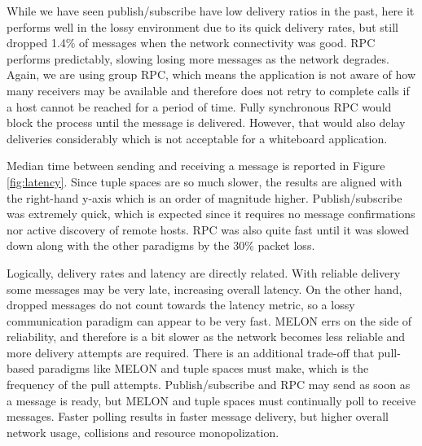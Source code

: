 While we have seen publish/subscribe have low delivery ratios in the past\cite{collins2010quantitative}, here it performs well in the lossy environment due to its quick delivery rates, but still dropped 1.4\% of messages when the network connectivity was good. RPC performs predictably, slowing losing more messages as the network degrades. Again, we are using group RPC, which means the application is not aware of how many receivers may be available and therefore does not retry to complete calls if a host cannot be reached for a period of time. Fully synchronous RPC would block the process until the message is delivered. However, that would also delay deliveries considerably which is not acceptable for a whiteboard application.

Median time between sending and receiving a message is reported in Figure \ref{fig:latency}. Since tuple spaces are so much slower, the results are aligned with the right-hand y-axis which is an order of magnitude higher. Publish/subscribe was extremely quick, which is expected since it requires no message confirmations nor active discovery of remote hosts. RPC was also quite fast until it was slowed down along with the other paradigms by the 30\% packet loss.

Logically, delivery rates and latency are directly related. With reliable delivery some messages may be very late, increasing overall latency. On the other hand, dropped messages do not count towards the latency metric, so a lossy communication paradigm can appear to be very fast. MELON errs on the side of reliability, and therefore is a bit slower as the network becomes less reliable and more delivery attempts are required. There is an additional trade-off that pull-based paradigms like MELON and tuple spaces must make, which is the frequency of the pull attempts. Publish/subscribe and RPC may send as soon as a message is ready, but MELON and tuple spaces must continually poll to receive messages. Faster polling results in faster message delivery, but higher overall network usage, collisions and resource monopolization.

